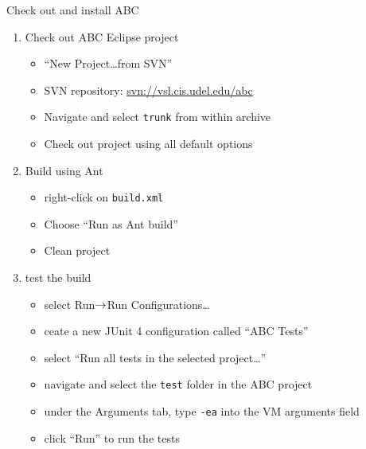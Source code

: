 \documentclass[t]{beamer}
\begin{document}
\begin{frame}{Check out and install ABC}
  \begin{enumerate}
  \item Check out ABC Eclipse project 
    \begin{itemize}
    \item ``New Project\ldots from SVN''
    \item SVN repository: \url{svn://vsl.cis.udel.edu/abc}
    \item Navigate and select \texttt{trunk} from within archive
    \item Check out project using all default options
    \end{itemize}
  \item Build using Ant
    \begin{itemize}
    \item right-click on \texttt{build.xml}
    \item Choose ``Run as Ant build''
    \item Clean project
    \end{itemize}
  \item test the build
    \begin{itemize}
    \item select Run$\rightarrow$Run Configurations\ldots
    \item ceate a new JUnit 4 configuration called ``ABC Tests''
    \item select ``Run all tests in the selected project\ldots''
    \item navigate and select the \texttt{test} folder in the ABC project
    \item under the Arguments tab, type \texttt{-ea} into the VM arguments field
    \item click ``Run'' to run the tests
    \end{itemize}
  \end{enumerate}
\end{frame}
\end{document}
